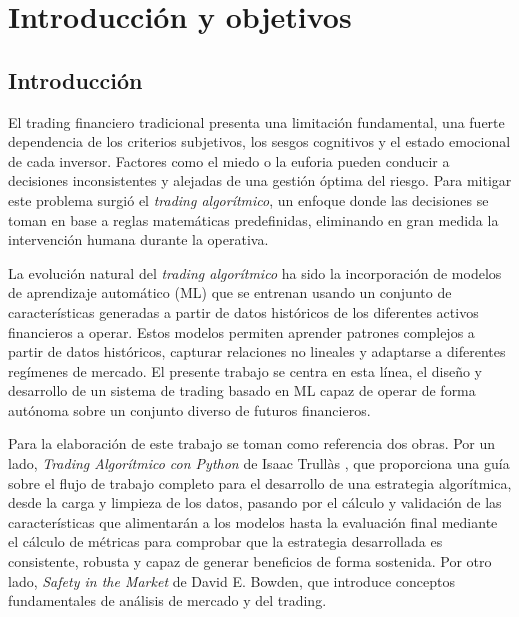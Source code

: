 \setlength{\parindent}{0em}

\chapter{Introducción y objetivos}\label{cap1}\thispagestyle{fancy}

\vspace{-1.3cm}

\section{Introducción}

El trading financiero tradicional presenta una limitación fundamental, una fuerte dependencia de los criterios subjetivos, los sesgos cognitivos y el
estado emocional de cada inversor. Factores como el miedo o la euforia pueden conducir a decisiones inconsistentes y alejadas de una gestión óptima
del riesgo. Para mitigar este problema surgió el \textit{trading algorítmico}, un enfoque donde las decisiones se toman en base a reglas matemáticas
predefinidas, eliminando en gran medida la intervención humana durante la operativa.

La evolución natural del \textit{trading algorítmico} ha sido la incorporación de modelos de aprendizaje automático (ML) que se entrenan usando un
conjunto de características generadas a partir de datos históricos de los diferentes activos financieros a operar. Estos modelos permiten aprender
patrones complejos a partir de datos históricos, capturar relaciones no lineales y adaptarse a diferentes regímenes de mercado. El presente trabajo se
centra en esta línea, el diseño y desarrollo de un sistema de trading basado en ML capaz de operar de forma autónoma sobre un conjunto diverso de
futuros financieros.

Para la elaboración de este trabajo se toman como referencia dos obras. Por un lado, \textit{Trading Algorítmico con Python} de Isaac Trullàs
\cite{Trullas2024}, que proporciona una guía sobre el flujo de trabajo completo para el desarrollo de una estrategia algorítmica, desde la carga y
limpieza de los datos, pasando por el cálculo y validación de las características que alimentarán a los modelos hasta la evaluación final mediante el
cálculo de métricas para comprobar que la estrategia desarrollada es consistente, robusta y capaz de generar beneficios de forma sostenida. Por otro
lado, \textit{Safety in the Market} de David E. Bowden\cite{bowden1997safety}, que introduce conceptos fundamentales de análisis de mercado y del
trading.

